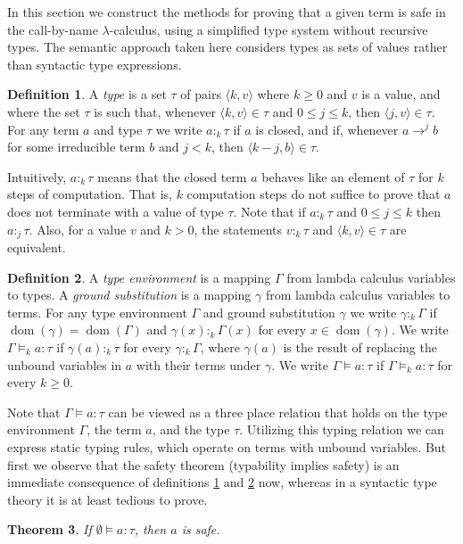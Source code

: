 \documentclass[10pt,a4paper,draft,twocolumn]{article}
\theoremstyle{definition}
\newtheorem{definition}{Definition}
\theoremstyle{plain}
\newtheorem{theorem}[definition]{Theorem}
\newcommand{\pair}[1]{\ensuremath{\langle{#1}\rangle}}
\DeclareMathOperator{\dom}{dom}
\begin{document}
In this section we construct the methods for proving that a given term is safe in the call-by-name
$\lambda$-calculus, using a simplified type system without recursive types. The semantic approach
taken here considers types as sets of values rather than syntactic type expressions.
\begin{definition} \label{def:Type}
  A \emph{type} is a set $\tau$ of pairs $\pair{k,v}$ where $k \ge 0$ and $v$ is a value, and where the
  set $\tau$ is such that, whenever $\pair{k,v} \in \tau$ and $0 \le j \le k$, then $\pair{j,v} \in \tau$.
  For any term $a$ and type $\tau$ we write $a :_k \tau$ if $a$ is closed, and if, whenever $a \to^j b$ for some
  irreducible term $b$ and $j < k$, then $\pair{k-j,b} \in \tau$.
\end{definition}
Intuitively, $a :_k \tau$ means that the closed term $a$ behaves like an element of $\tau$ for $k$ steps
of computation. That is, $k$ computation steps do not suffice to prove that $a$ does not terminate with
a value of type $\tau$. Note that if $a :_k \tau$ and $0 \le j \le k$ then $a :_j \tau$. Also, for a value
$v$ and $k > 0$, the statements $v :_k \tau$ and $\pair{k,v} \in \tau$ are equivalent.
\begin{definition} \label{def:Typing}
  A \emph{type environment} is a mapping $\Gamma$ from lambda calculus variables to types. A
  \emph{ground substitution} is a mapping $\gamma$ from lambda calculus variables to terms. For
  any type environment $\Gamma$ and ground substitution $\gamma$ we write $\gamma :_k \Gamma$ if
  $\dom(\gamma) = \dom(\Gamma)$ and $\gamma(x) :_k \Gamma(x)$ for every $x \in \dom(\gamma)$. We
  write $\Gamma \models_k a : \tau$ if $\gamma(a) :_k \tau$ for every $\gamma :_k \Gamma$,
  where $\gamma(a)$ is the result of replacing the unbound variables in $a$ with their terms under
  $\gamma$. We write $\Gamma \models a : \tau$ if $\Gamma \models_k a : \tau$ for every $k \ge 0$.
\end{definition}
Note that $\Gamma \models a : \tau$ can be viewed as a three place relation that holds on the
type environment $\Gamma$, the term $a$, and the type $\tau$. Utilizing this typing relation
we can express static typing rules, which operate on terms with unbound variables. But first
we observe that the safety theorem (typability implies safety) is an immediate consequence
of definitions \ref{def:Type} and \ref{def:Typing} now, whereas in a syntactic type theory
it is at least tedious to prove.
\begin{theorem}
  If $\emptyset \models a : \tau$, then $a$ is safe.
\end{theorem}
\end{document}
